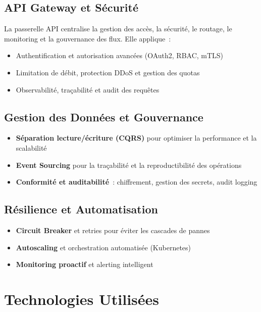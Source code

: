 \documentclass[12pt,a4paper]{article}
\begin{document}
\subsection{API Gateway et Sécurité}
La passerelle API centralise la gestion des accès, la sécurité, le routage, le monitoring et la gouvernance des flux. Elle applique :
\begin{itemize}
    \item Authentification et autorisation avancées (OAuth2, RBAC, mTLS)
    \item Limitation de débit, protection DDoS et gestion des quotas
    \item Observabilité, traçabilité et audit des requêtes
\end{itemize}

\subsection{Gestion des Données et Gouvernance}
\begin{itemize}
    \item \textbf{Séparation lecture/écriture (CQRS)} pour optimiser la performance et la scalabilité
    \item \textbf{Event Sourcing} pour la traçabilité et la reproductibilité des opérations
    \item \textbf{Conformité et auditabilité} : chiffrement, gestion des secrets, audit logging
\end{itemize}

\subsection{Résilience et Automatisation}
\begin{itemize}
    \item \textbf{Circuit Breaker} et retries pour éviter les cascades de pannes
    \item \textbf{Autoscaling} et orchestration automatisée (Kubernetes)
    \item \textbf{Monitoring proactif} et alerting intelligent
\end{itemize}

\section{Technologies Utilisées}
\end{document}
